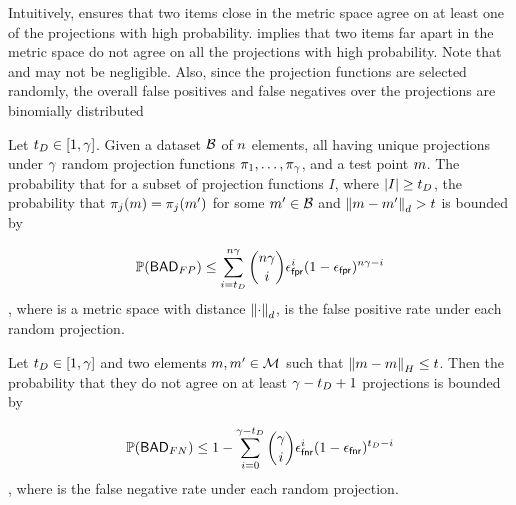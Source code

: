 Intuitively,  ensures that two items close in the metric space agree on at least one of the projections 
with high probability.  implies that two items far apart in the metric space do not agree on all the projections 
with high probability. Note that \fpr and \fnr may not be negligible. Also, since the projection functions are selected randomly, the overall false positives and false negatives over the projections are binomially distributed 


\begin{corollary}
 \label{eq:false_pos_bound} 
Let $t_{D} \in [1, \gamma]$. Given a dataset $\blocklist$ of $n$ elements, all having unique projections under $\gamma$ random projection functions $\projFn[1], \dots, \projFn[\numProjections]$, and a  test point $\genericMetricSpaceElmt$. The probability that for a subset of projection functions $I$, where $\left|{I}\right| \ge t_{D}$, the probability that $\projFn[\projIdx](\genericMetricSpaceElmt) = \projFn[\projIdx](\genericMetricSpaceElmt')$ for some $\genericMetricSpaceElmt' \in \blocklist$ and $\distanceNotation[\distance][\genericMetricSpaceElmt][\genericMetricSpaceElmtAlt] > 
			\threshold$ is bounded by 


\[			 \mathbb{P}\mathopen{}\left({\mathsf{BAD}_{FP}}\right)\mathclose{}
 \le \sum\limits_{i = t_{D}}^{n \gamma} \binom{n\gamma}{i} \epsilon_\mathsf{fpr}^{i} (1 - \epsilon_\mathsf{fpr})^{n \gamma - i}
\]
, where  \metricSpace is a metric space with distance $\distanceNotation[\distance][\cdot]$, \fpr is the false positive rate under each random projection.
\end{corollary}


\begin{corollary}
 \label{eq:false_neg_bound}
Let $t_{D} \in [1, \gamma]$ and two elements $\genericMetricSpaceElmt, \genericMetricSpaceElmtAlt \in \metricSpace$ such that $\hammingDist{\genericMetricSpaceElmt}{\genericMetricSpaceElmt} \le \threshold$. Then the probability that they do not agree on at least $\gamma - t_{D} + 1$ projections is bounded by 

\[	
\mathbb{P}\mathopen{}\left({\mathsf{BAD}_{FN}}\right)\mathclose{} \le 1 - \sum\limits_{i = 0}^{\gamma - t_{D}} \binom{\gamma}{i} \epsilon_\mathsf{fnr}^{i} (1 - \epsilon_\mathsf{fnr})^{t_{D} - i}
\]
, where \fnr is the false negative rate under each random projection.

\end{corollary}


